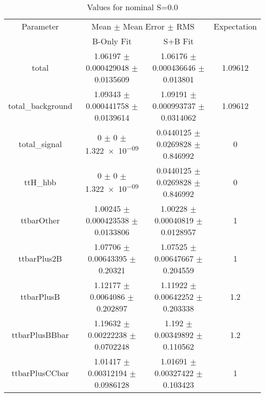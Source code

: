 \begin{table}
\centering
\caption{Values for nominal S=0.0}
\begin{tabular}{cccc}
\toprule
Parameter & \multicolumn{2}{c}{Mean $\pm$ Mean Error $\pm$ RMS} & Expectation\\
 & B-Only Fit & S+B Fit & \\
\midrule
total & \num{1.06197} $\pm$ \num{0.000429048} $\pm$ \num{0.0135609} & \num{1.06176} $\pm$ \num{0.000436646} $\pm$ \num{0.013801} & \num{1.09612}\\
total\_background & \num{1.09343} $\pm$ \num{0.000441758} $\pm$ \num{0.0139614} & \num{1.09191} $\pm$ \num{0.000993737} $\pm$ \num{0.0314062} & \num{1.09612}\\
total\_signal & \num{0} $\pm$ \num{0} $\pm$ \num{1.322e-09} & \num{0.0440125} $\pm$ \num{0.0269828} $\pm$ \num{0.846992} & \num{0}\\
ttH\_hbb & \num{0} $\pm$ \num{0} $\pm$ \num{1.322e-09} & \num{0.0440125} $\pm$ \num{0.0269828} $\pm$ \num{0.846992} & \num{0}\\
ttbarOther & \num{1.00245} $\pm$ \num{0.000423538} $\pm$ \num{0.0133806} & \num{1.00228} $\pm$ \num{0.00040819} $\pm$ \num{0.0128957} & \num{1}\\
ttbarPlus2B & \num{1.07706} $\pm$ \num{0.00643395} $\pm$ \num{0.20321} & \num{1.07525} $\pm$ \num{0.00647667} $\pm$ \num{0.204559} & \num{1}\\
ttbarPlusB & \num{1.12177} $\pm$ \num{0.0064086} $\pm$ \num{0.202897} & \num{1.11922} $\pm$ \num{0.00642252} $\pm$ \num{0.203338} & \num{1.2}\\
ttbarPlusBBbar & \num{1.19632} $\pm$ \num{0.00222238} $\pm$ \num{0.0702248} & \num{1.192} $\pm$ \num{0.00349892} $\pm$ \num{0.110562} & \num{1.2}\\
ttbarPlusCCbar & \num{1.01417} $\pm$ \num{0.00312194} $\pm$ \num{0.0986128} & \num{1.01691} $\pm$ \num{0.00327422} $\pm$ \num{0.103423} & \num{1}\\
\bottomrule
\end{tabular}
\end{table}